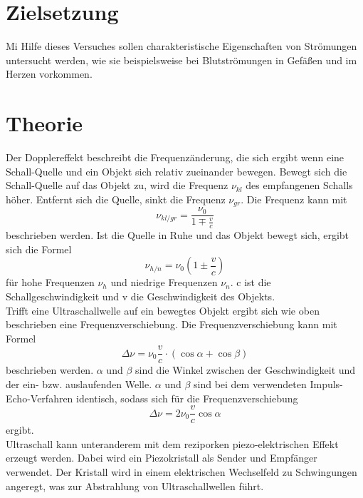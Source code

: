 
\section{Zielsetzung}
Mi Hilfe dieses Versuches sollen charakteristische Eigenschaften von Strömungen untersucht werden,
wie sie beispielsweise bei Blutströmungen in Gefäßen und im Herzen vorkommen.
\section{Theorie}
Der Dopplereffekt beschreibt die Frequenzänderung, die sich ergibt wenn eine Schall-Quelle und ein Objekt sich
relativ zueinander bewegen.
Bewegt sich die Schall-Quelle auf das Objekt zu, wird die Frequenz $\nu_{kl}$ des empfangenen Schalls höher.
Entfernt sich die Quelle, sinkt die Frequenz $\nu_{gr}$.
Die Frequenz kann mit
\begin{equation}
  \nu_{kl/gr} = \frac{\nu_0}{1 \mp \frac{v}{c}}
\end{equation}
beschrieben werden.
Ist die Quelle in Ruhe und das Objekt bewegt sich, ergibt sich die Formel
\begin{equation}
  \nu_{h/n} = \nu_0 \left(1\pm\frac{v}{c}\right)
\end{equation}
für hohe Frequenzen $\nu_h$ und niedrige Frequenzen $\nu_n$.
c ist die Schallgeschwindigkeit und v die Geschwindigkeit des Objekts.\\
Trifft eine Ultraschallwelle auf ein bewegtes Objekt ergibt sich wie oben beschrieben eine Frequenzverschiebung.
Die Frequenzverschiebung kann mit Formel
\begin{equation}
  \Delta \nu = \nu_0 \frac{v}{c}\cdot(\cos\alpha+\cos\beta)
\end{equation}
beschrieben werden.
$\alpha$ und $\beta$ sind die Winkel zwischen der Geschwindigkeit und der ein- bzw. auslaufenden Welle.
$\alpha$ und $\beta$ sind bei dem verwendeten Impuls-Echo-Verfahren identisch, sodass sich für die Frequenzverschiebung
\begin{equation}
  \Delta\nu = 2\nu_0\frac{v}{c}\cos{\alpha}
  \label{eqn:2}
\end{equation}
ergibt.\\
Ultraschall kann unteranderem mit dem reziporken piezo-elektrischen Effekt erzeugt werden.
Dabei wird ein Piezokristall als Sender und Empfänger verwendet.
Der Kristall wird in einem elektrischen Wechselfeld zu Schwingungen angeregt, was zur Abstrahlung von Ultraschallwellen führt.



